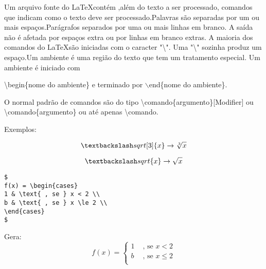 Um arquivo fonte do \LaTeX contém ,além do texto a ser processado, comandos que indicam como o texto deve ser processado.Palavras são separadas por um ou mais espaços.Parágrafos separados por uma ou mais linhas em branco. A saída não é afetada por espaços extra ou por linhas em branco extras. A maioria dos comandos do \LaTeX são iniciadas com o caracter "\textbackslash ".\cite{Reginaldo} Uma "\textbackslash " sozinha produz um espaço.Um ambiente é uma região do texto que tem um tratamento especial. Um ambiente é iniciado com

\textbackslash begin\{nome do ambiente\} e terminado por $\backslash$end\{nome do ambiente\}.

O normal padrão de comandos são do tipo \textbackslash comando\{argumento\}[Modifier] ou \textbackslash comando\{argumento\} ou até apenas \textbackslash comando.

Exemplos: 

 $$\textbackslash sqrt[3]\{x\} \rightarrow \sqrt[3]{x}$$

 $$\textbackslash sqrt\{x\} \rightarrow \sqrt{x}$$
 


\begin{verbatim}
$
f(x) = \begin{cases}
1 & \text{ , se } x < 2 \\
b & \text{ , se } x \le 2 \\
\end{cases}
$

\end{verbatim}

Gera: 
$$
f(x) = \begin{cases}
1 & \text{ , se } x < 2 \\
b & \text{ , se } x \le 2 \\
\end{cases}
$$
\\
